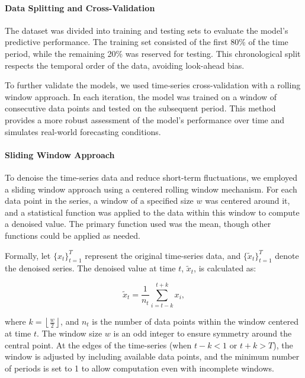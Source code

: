 \paragraph{Data Splitting and Cross-Validation}

The dataset was divided into training and testing sets to evaluate the model's predictive performance. The training set consisted of the first 80\% of the time period, while the remaining 20\% was reserved for testing. This chronological split respects the temporal order of the data, avoiding look-ahead bias.

To further validate the models, we used time-series cross-validation with a rolling window approach. In each iteration, the model was trained on a window of consecutive data points and tested on the subsequent period. This method provides a more robust assessment of the model's performance over time and simulates real-world forecasting conditions.

\paragraph{Sliding Window Approach}

To denoise the time-series data and reduce short-term fluctuations, we employed a sliding window approach using a centered rolling window mechanism. For each data point in the series, a window of a specified size $w$ was centered around it, and a statistical function was applied to the data within this window to compute a denoised value. The primary function used was the mean, though other functions could be applied as needed.

Formally, let $\{ x_t \}_{t=1}^T$ represent the original time-series data, and $\{ \tilde{x}_t \}_{t=1}^T$ denote the denoised series. The denoised value at time $t$, $\tilde{x}_t$, is calculated as:

\begin{equation}
\tilde{x}_t = \frac{1}{n_t} \sum_{i = t - k}^{t + k} x_i,
\end{equation}

where $k = \left\lfloor \frac{w}{2} \right\rfloor$, and $n_t$ is the number of data points within the window centered at time $t$. The window size $w$ is an odd integer to ensure symmetry around the central point. At the edges of the time-series (when $t - k < 1$ or $t + k > T$), the window is adjusted by including available data points, and the minimum number of periods is set to 1 to allow computation even with incomplete windows.

